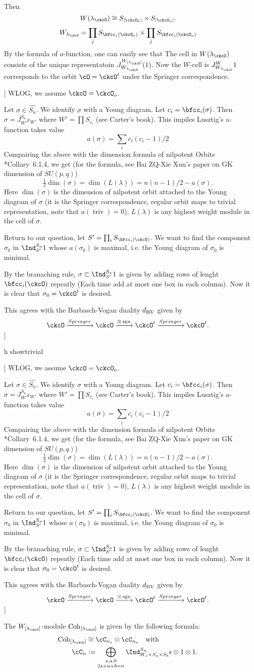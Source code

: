 \documentclass[12pt,a4paper]{amsart}
\newcommand{\trivial}[2][]{\if\relax\detokenize{#1}\relax
  {%
      \color{orange} \vspace{0em} $[$  #2 $]$
      \color{black}
  }
  \else
\ifx#1h
\ifcsname showtrivial\endcsname
{%
    \color{orange} \vspace{0em}  $[$ #2 $]$
    \color{black}
}
\fi
\else {\red Wrong argument!} \fi
\fi
}
\def\abs#1{\left|{#1}\right|}
\newcommand{\sgn}{\operatorname{sgn}}
\newcommand{\triv}{\operatorname{triv}}
\numberwithin{equation}{section}
\theoremstyle{remark}
\def\half{{\tfrac{1}{2}}}
\begin{document}
Then 
\[
  W(\lambda_\ckcO)  \cong S_{\abs{\ckcO_e}}\times S_{\abs{\ckcO_o}}. 
\]
\[
 W_{\lambda_\ckcO} = \prod_j S_{\bfcc_j(\ckcO_e)}\times \prod_j S_{\bfcc_j(\ckcO_o)} 
\]
By the formula of $a$-function, one can easily see that 
The cell in $W(\lamck)$ consists of the unique representatoin $J_{W_{\lamck}}^{\Wint{\lamck}} (1)$.
Now the $W$-cell is $J_{W_{\lamck}}^W 1$ corresponds to the orbit $\cO= \ckcO^t $ under the Springer
correspondence. 
\trivial{
WLOG, we assume $\ckcO =  \ckcO_o$.

Let $\sigma\in \widehat{S_n}$. We identify $\sigma$ with a Young diagram. 
Let $c_i = \bfcc_i(\sigma)$.
Then $\sigma = J^{S_n}_{W'} \epsilon_{W'}$ where $W' = \prod S_{c_i}$
(see Carter's book). 
This impiles Lusztig's a-function takes value  
\[
a(\sigma) = \sum_i c_i(c_i-1) /2
\]
Compairing the above with the dimension formula of nilpotent Orbits
\cite{CM}*{Collary~6.1.4}, we get (for the formula, see Bai ZQ-Xie Xun's paper on 
GK dimension of $SU(p,q)$)
\[
\half \dim(\sigma) = \dim(L(\lambda)) = n(n-1)/2 - a(\sigma).
\]
Here $\dim(\sigma)$ is the dimension of nilpotent orbit attached to the Young
diagram of $\sigma$ (it is the Springer correspondence, regular orbit maps to
trivial representation, note that $a(\triv)=0$), $L(\lambda)$ is any highest
weight module in the cell of $\sigma$. 


Return to our question, let $S' = \prod_i S_{\bfcc_i(\ckcO)}$. We want to find
the component $\sigma_0$ in $\Ind_{S'}^{S_n} 1$ whose $a(\sigma_0)$ is maximal,
i.e. the Young diagram of $\sigma_0$ is minimal. 

 By the branaching rule, $\sigma \subset \Ind_{S'}^{S_n} 1$ is given by adding
 rows of lenght $\bfcc_i(\ckcO)$ repeatly (Each time add at most one box in each
 column). 
 Now it is clear that $\sigma_0 = \ckcO^t$ is desired. 

 This agrees with the Barbasch-Vogan duality $d_{\mathrm{BV}}$ given by 
 \[
  \ckcO \xrightarrow{Springer}\ckcO \xrightarrow{\otimes \sgn} \ckcO^t 
  \xrightarrow{Springer} \ckcO^t.
 \]
}

The $\Wint{\lamck}$-module $\Cint{\lamck}$ is given by the following formula:
\[
  \begin{split}
  \Cint{\lamck} &\cong \cC_{n_e}\otimes \cC_{n_o} \quad \text{with} \\ 
 \cC_n &:= \bigoplus_{\substack{s,a,b\\2s+a+b=n}} 
 \Ind_{W_s\times S_a\times S_b}^{S_{n}} \epsilon \otimes 1\otimes 1. %
  \end{split}
\] 
\end{document}
